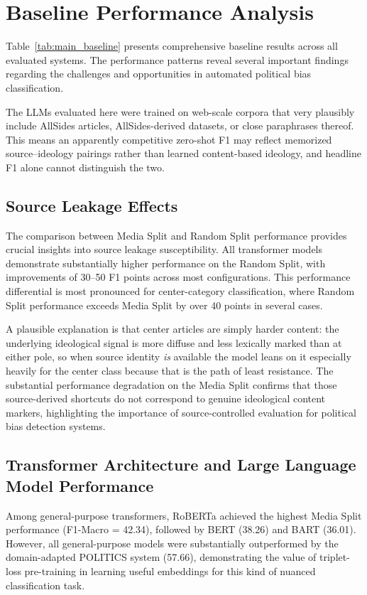 
\section{Baseline Performance Analysis}
\label{sec:baseline-results}

Table~\ref{tab:main_baseline} presents comprehensive baseline results across all evaluated systems. The performance patterns reveal several important findings regarding the challenges and opportunities in automated political bias classification.

The LLMs evaluated here were trained on web-scale corpora that very plausibly include AllSides articles, AllSides-derived datasets, or close paraphrases thereof. This means an apparently competitive zero-shot F1 may reflect memorized source--ideology pairings rather than learned content-based ideology, and headline F1 alone cannot distinguish the two. 

\subsection{Source Leakage Effects}

The comparison between Media Split and Random Split performance provides crucial insights into source leakage susceptibility. All transformer models demonstrate substantially higher performance on the Random Split, with improvements of 30--50 F1 points across most configurations. This performance differential is most pronounced for center-category classification, where Random Split performance exceeds Media Split by over 40 points in several cases.

A plausible explanation is that center articles are simply harder content: the underlying ideological signal is more diffuse and less lexically marked than at either pole, so when source identity \emph{is} available the model leans on it especially heavily for the center class because that is the path of least resistance. The substantial performance degradation on the Media Split confirms that those source-derived shortcuts do not correspond to genuine ideological content markers, highlighting the importance of source-controlled evaluation for political bias detection systems.

\subsection{Transformer Architecture and Large Language Model Performance}

Among general-purpose transformers, RoBERTa achieved the highest Media Split performance (F1-Macro = 42.34), followed by BERT (38.26) and BART (36.01). However, all general-purpose models were substantially outperformed by the domain-adapted POLITICS system (57.66), demonstrating the value of triplet-loss pre-training in learning useful embeddings for this kind of nuanced classification task.

